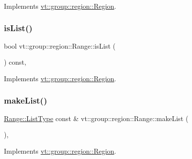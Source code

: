 Implements \hyperlink{structvt_1_1group_1_1region_1_1_region_a09d21333389937f11dd5d3e6ba566c54}{vt\+::group\+::region\+::\+Region}.

\mbox{\label{structvt_1_1group_1_1region_1_1_range_aaa2df0017d61507802bcc90a88fcda91}} 
\subsubsection{\texorpdfstring{is\+List()}{isList()}}
{\footnotesize\ttfamily bool vt\+::group\+::region\+::\+Range\+::is\+List (\begin{DoxyParamCaption}{ }\end{DoxyParamCaption}) const\hspace{0.3cm}{\ttfamily [override]}, {\ttfamily [virtual]}}



Implements \hyperlink{structvt_1_1group_1_1region_1_1_region_a5c05e6ebee5a6d7e77d9ebf33c9ff50c}{vt\+::group\+::region\+::\+Region}.

\mbox{\label{structvt_1_1group_1_1region_1_1_range_abd64b2d424a89ab0f603be15957d0fd4}} 
\subsubsection{\texorpdfstring{make\+List()}{makeList()}}
{\footnotesize\ttfamily \hyperlink{structvt_1_1group_1_1region_1_1_region_a4e35b2fc6dca06aca0b7bc0e19b35c5a}{Range\+::\+List\+Type} const  \& vt\+::group\+::region\+::\+Range\+::make\+List (\begin{DoxyParamCaption}{ }\end{DoxyParamCaption})\hspace{0.3cm}{\ttfamily [override]}, {\ttfamily [virtual]}}



Implements \hyperlink{structvt_1_1group_1_1region_1_1_region_ac85c027b3c402c712c888aefc198c6be}{vt\+::group\+::region\+::\+Region}.

\mbox{\label{structvt_1_1group_1_1region_1_1_range_a7a1ee1554643ce6074d24dc129cef8a1}} 
